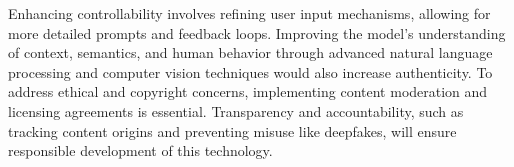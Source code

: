 Enhancing controllability involves refining user input mechanisms, allowing for more detailed prompts and feedback loops. Improving the model’s understanding of context, semantics, and human behavior through advanced natural language processing and computer vision techniques would also increase authenticity. To address ethical and copyright concerns, implementing content moderation and licensing agreements is essential. Transparency and accountability, such as tracking content origins and preventing misuse like deepfakes, will ensure responsible development of this technology.
